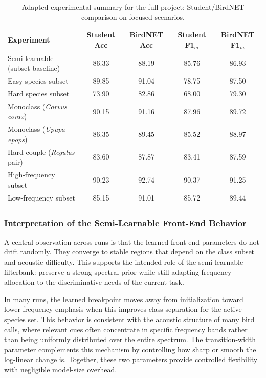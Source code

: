 \documentclass[a4paper,singleside,12pt]{report} %
\begin{document}
	\begin{table}[H]
		\centering
		\scriptsize
		\renewcommand{\arraystretch}{1.15}
		\setlength{\tabcolsep}{5pt}
		\caption[Student/BirdNET comparison on focused scenarios.]{Adapted experimental summary for the full project: Student/BirdNET comparison on focused scenarios.}
		\label{tab:full_experiment_summary_focused_student_birdnet}
		\begin{tabular}{|l|c|c|c|c|}
			\hline
			Experiment & Student Acc & BirdNET Acc & Student F1$_m$ & BirdNET F1$_m$ \\
			\hline
			Semi-learnable (subset baseline) & 86.33 & 88.19 & 85.76 & 86.93 \\
			\hline
			Easy species subset & 89.85 & 91.04 & 78.75 & 87.50 \\
			\hline
			Hard species subset & 73.90 & 82.86 & 68.00 & 79.30 \\
			\hline
			Monoclass (\emph{Corvus corax}) & 90.15 & 91.16 & 87.96 & 89.72 \\
			\hline
			Monoclass (\emph{Upupa epops}) & 86.35 & 89.45 & 85.52 & 88.97 \\
			\hline
			Hard couple (\emph{Regulus} pair) & 83.60 & 87.87 & 83.41 & 87.59 \\
			\hline
			High-frequency subset & 90.23 & 92.74 & 90.37 & 91.25 \\
			\hline
			Low-frequency subset & 85.15 & 91.01 & 85.72 & 89.44 \\
			\hline
		\end{tabular}
	\end{table}

	\subsubsection{Interpretation of the Semi-Learnable Front-End Behavior}
	A central observation across runs is that the learned front-end parameters do not drift randomly. They converge to stable regions that depend on the class subset and acoustic difficulty. This supports the intended role of the semi-learnable filterbank: preserve a strong spectral prior while still adapting frequency allocation to the discriminative needs of the current task.

	In many runs, the learned breakpoint moves away from initialization toward lower-frequency emphasis when this improves class separation for the active species set. This behavior is consistent with the acoustic structure of many bird calls, where relevant cues often concentrate in specific frequency bands rather than being uniformly distributed over the entire spectrum. The transition-width parameter complements this mechanism by controlling how sharp or smooth the log-linear change is. Together, these two parameters provide controlled flexibility with negligible model-size overhead.
\end{document}
